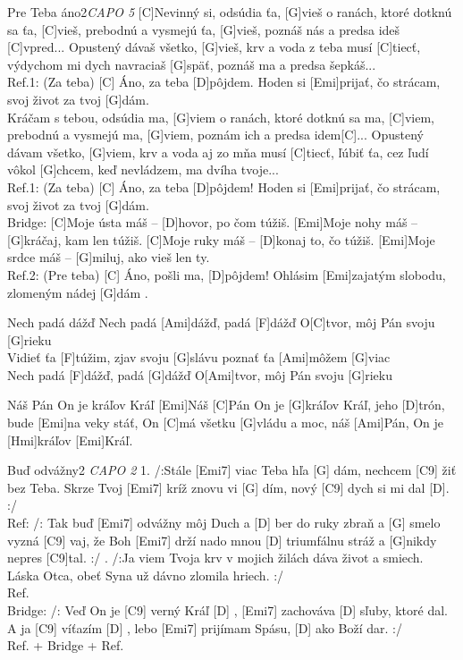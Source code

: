 \documentclass[12pt]{article}
\begin{document}
\begin{song}{Pre Teba áno}{2}\textit{CAPO 5}
	[C]Nevinný si, odsúdia ťa, [G]vieš
	o ranách, ktoré dotknú sa ťa, [C]vieš,
	prebodnú a vysmejú ťa, [G]vieš,
	poznáš nás a predsa ideš [C]vpred...
	Opustený dávaš všetko, [G]vieš,
	krv a voda z teba musí [C]tiecť,
	výdychom mi dych navraciaš [G]späť,
	poznáš ma a predsa šepkáš...
	\\
	Ref.1: (Za teba) [C] Áno, za teba [D]pôjdem.
	Hoden si [Emi]prijať, čo strácam,
	svoj život za tvoj [G]dám.
	\\
	[C]Kráčam s tebou, odsúdia ma, [G]viem
	o ranách, ktoré dotknú sa ma, [C]viem,
	prebodnú a vysmejú ma, [G]viem,
	poznám ich a predsa idem[C]...
	Opustený dávam všetko, [G]viem,
	krv a voda aj zo mňa musí [C]tiecť,
	ľúbiť ťa, cez ľudí vôkol [G]chcem,
	keď nevládzem, ma dvíha tvoje...
	\\
	Ref.1: (Za teba) [C] Áno, za teba [D]pôjdem!
	Hoden si [Emi]prijať, čo strácam,
	svoj život za tvoj [G]dám.
	\\
	Bridge: [C]Moje ústa máš – [D]hovor, po čom túžiš.
	[Emi]Moje nohy máš – [G]kráčaj, kam len túžiš.
	[C]Moje ruky máš – [D]konaj to, čo túžiš.
	[Emi]Moje srdce máš – [G]miluj, ako vieš len ty.
	\\
	Ref.2: (Pre teba) [C] Áno, pošli ma, [D]pôjdem!
	Ohlásim [Emi]zajatým slobodu, zlomeným nádej [G]dám .
\end{song}

\begin{songgroup}{2}
\begin{groupitem}{Nech padá dážď}
	Nech padá [Ami]dážď, padá [F]dážď
	O[C]tvor, môj Pán svoju [G]rieku
	\\
	Vidieť ťa [F]túžim, zjav svoju [G]slávu
	poznať ťa [Ami]môžem [G]viac
	\\
	Nech padá [F]dážď, padá [G]dážď
	O[Ami]tvor, môj Pán svoju [G]rieku
\end{groupitem}
\columnbreak
\begin{groupitem}{Náš Pán On je kráľov Kráľ}
	[Emi]Náš [C]Pán On je [G]kráľov Kráľ, 
	jeho [D]trón, bude [Emi]na veky stáť, 
	On [C]má všetku [G]vládu a moc, 
	náš [Ami]Pán, On je [Hmi]kráľov [Emi]Kráľ.
\end{groupitem}
\end{songgroup}

\begin{song}{Buď odvážny}{2}
	\textit{CAPO 2}
	1. /:Stále [Emi7] viac Teba hľa [G] dám,
	nechcem [C9] žiť bez Teba.
	Skrze Tvoj [Emi7] kríž znovu vi [G] dím,
	nový [C9] dych si mi dal [D]. :/
	\\
	Ref:
	/: Tak buď [Emi7] odvážny môj Duch
	a [D] ber do ruky zbraň
	a [G] smelo vyzná [C9] vaj,
	že Boh [Emi7] drží nado mnou
	[D] triumfálnu stráž
	a [G]nikdy nepres [C9]tal. :/
	. /:Ja viem Tvoja krv
	v mojich žilách dáva život a smiech.
	Láska Otca, obeť Syna 
	už dávno zlomila hriech. :/
	\\
	Ref.
	\\
	Bridge: /: Veď On je [C9] verný Kráľ [D] ,
	[Emi7] zachováva [D] sľuby, ktoré dal.
	A ja [C9] víťazím [D] ,
	lebo [Emi7] prijímam Spásu, [D] ako Boží dar. :/
	\\
	Ref. + Bridge + Ref.
\end{song}
\end{document}

